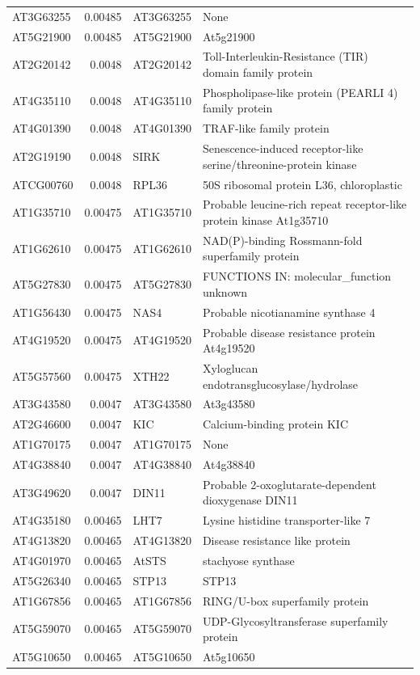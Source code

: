 \documentclass[11pt]{article}
\begin{document}
\begin{center}
\begin{tabular}{lrll}
AT3G63255 & 0.00485 & AT3G63255 & None\\
AT5G21900 & 0.00485 & AT5G21900 & At5g21900\\
AT2G20142 & 0.0048 & AT2G20142 & Toll-Interleukin-Resistance (TIR) domain family protein\\
AT4G35110 & 0.0048 & AT4G35110 & Phospholipase-like protein (PEARLI 4) family protein\\
AT4G01390 & 0.0048 & AT4G01390 & TRAF-like family protein\\
AT2G19190 & 0.0048 & SIRK & Senescence-induced receptor-like serine/threonine-protein kinase\\
ATCG00760 & 0.0048 & RPL36 & 50S ribosomal protein L36, chloroplastic\\
AT1G35710 & 0.00475 & AT1G35710 & Probable leucine-rich repeat receptor-like protein kinase At1g35710\\
AT1G62610 & 0.00475 & AT1G62610 & NAD(P)-binding Rossmann-fold superfamily protein\\
AT5G27830 & 0.00475 & AT5G27830 & FUNCTIONS IN: molecular\_function unknown\\
AT1G56430 & 0.00475 & NAS4 & Probable nicotianamine synthase 4\\
AT4G19520 & 0.00475 & AT4G19520 & Probable disease resistance protein At4g19520\\
AT5G57560 & 0.00475 & XTH22 & Xyloglucan endotransglucosylase/hydrolase\\
AT3G43580 & 0.0047 & AT3G43580 & At3g43580\\
AT2G46600 & 0.0047 & KIC & Calcium-binding protein KIC\\
AT1G70175 & 0.0047 & AT1G70175 & None\\
AT4G38840 & 0.0047 & AT4G38840 & At4g38840\\
AT3G49620 & 0.0047 & DIN11 & Probable 2-oxoglutarate-dependent dioxygenase DIN11\\
AT4G35180 & 0.00465 & LHT7 & Lysine histidine transporter-like 7\\
AT4G13820 & 0.00465 & AT4G13820 & Disease resistance like protein\\
AT4G01970 & 0.00465 & AtSTS & stachyose synthase\\
AT5G26340 & 0.00465 & STP13 & STP13\\
AT1G67856 & 0.00465 & AT1G67856 & RING/U-box superfamily protein\\
AT5G59070 & 0.00465 & AT5G59070 & UDP-Glycosyltransferase superfamily protein\\
AT5G10650 & 0.00465 & AT5G10650 & At5g10650\\

\end{tabular}
\end{center}
\end{document}
